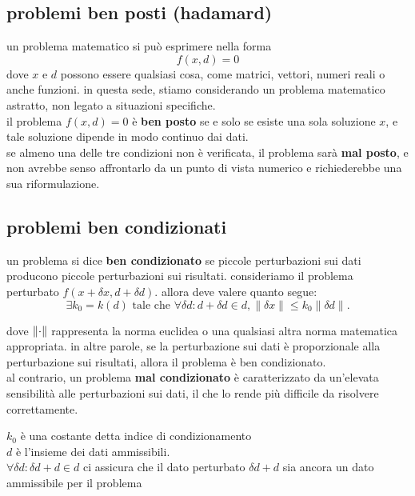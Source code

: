 \documentclass{article}
\begin{document}
\newpage

\subsection{problemi ben posti (hadamard)}
un problema matematico si può esprimere nella forma 
\begin{equation}
  f(x,d)=0 \label{eq:problema matematico}
\end{equation}
dove $x$ e $d$ possono essere qualsiasi cosa, come matrici, vettori, numeri reali o anche funzioni. in questa sede, stiamo considerando un problema matematico astratto, non legato a situazioni specifiche. \\
il problema $f(x,d)=0$ è \textbf{ben posto} se e solo se esiste una sola soluzione $x$, e tale soluzione dipende in modo continuo dai dati.\\
se almeno una delle tre condizioni non è verificata, il problema sarà \textbf{mal posto}, e non avrebbe senso affrontarlo da un punto di vista numerico e richiederebbe una sua riformulazione.

\subsection{problemi ben condizionati}
un problema si dice \textbf{ben condizionato} se piccole perturbazioni sui dati producono piccole perturbazioni sui risultati. consideriamo il problema perturbato $f(x+\delta x, d+\delta d)$. allora deve valere quanto segue:
\begin{equation}
  \exists k_0=k(d)\text{ tale che }\forall\delta d:d+\delta d\in d,\|\delta x\|\leq k_0\|\delta d\|.
\end{equation} 

dove $\norm{\cdot}$ rappresenta la norma euclidea o una qualsiasi altra norma matematica appropriata. in altre parole, se la perturbazione sui dati è proporzionale alla perturbazione sui risultati, allora il problema è ben condizionato.\\
al contrario, un problema \textbf{mal condizionato} è caratterizzato da un'elevata sensibilità alle perturbazioni sui dati, il che lo rende più difficile da risolvere correttamente.\\ 
\begin{tcolorbox}[colback=white,colframe=black,title=nota]
  $k_0$ è una costante detta indice di condizionamento\\
  $d$ è l'insieme dei dati ammissibili. \\
  $\forall \delta d : \delta d + d \in d$ ci assicura che il dato perturbato $\delta d + d$ sia ancora un dato ammissibile per il problema
\end{tcolorbox} 
\end{document}
